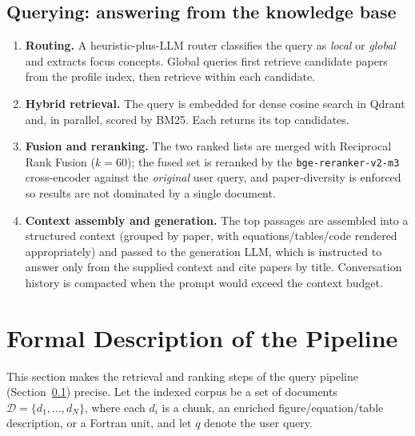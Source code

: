 \documentclass[11pt,a4paper]{article}
\newcommand{\code}[1]{\texttt{\small #1}}
\begin{document}
\subsection{Querying: answering from the knowledge base}
\label{sec:query}
\begin{enumerate}[leftmargin=1.5em,itemsep=2pt]
  \item \textbf{Routing.} A heuristic-plus-LLM router classifies the query as
        \emph{local} or \emph{global} and extracts focus concepts. Global queries
        first retrieve candidate papers from the profile index, then retrieve
        within each candidate.
  \item \textbf{Hybrid retrieval.} The query is embedded for dense cosine search
        in Qdrant and, in parallel, scored by BM25. Each returns its top
        candidates.
  \item \textbf{Fusion and reranking.} The two ranked lists are merged with
        Reciprocal Rank Fusion ($k{=}60$); the fused set is reranked by the
        \code{bge-reranker-v2-m3} cross-encoder against the \emph{original} user
        query, and paper-diversity is enforced so results are not dominated by a
        single document.
  \item \textbf{Context assembly and generation.} The top passages are assembled
        into a structured context (grouped by paper, with equations/tables/code
        rendered appropriately) and passed to the generation LLM, which is
        instructed to answer only from the supplied context and cite papers by
        title. Conversation history is compacted when the prompt would exceed the
        context budget.
\end{enumerate}

\section{Formal Description of the Pipeline}
This section makes the retrieval and ranking steps of the query pipeline
(Section~\ref{sec:query}) precise. Let the indexed corpus be a set of
documents $\mathcal{D}=\{d_1,\dots,d_N\}$, where each $d_i$ is a chunk, an
enriched figure/equation/table description, or a Fortran unit, and let $q$ denote
the user query.
\end{document}
